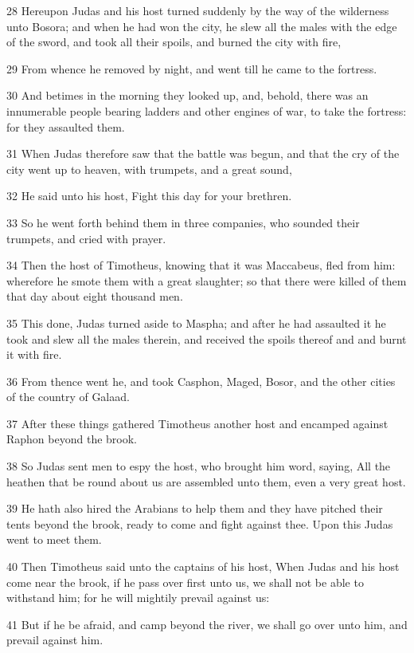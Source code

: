 \par 28 Hereupon Judas and his host turned suddenly by the way of the wilderness unto Bosora; and when he had won the city, he slew all the males with the edge of the sword, and took all their spoils, and burned the city with fire,
\par 29 From whence he removed by night, and went till he came to the fortress.
\par 30 And betimes in the morning they looked up, and, behold, there was an innumerable people bearing ladders and other engines of war, to take the fortress: for they assaulted them.
\par 31 When Judas therefore saw that the battle was begun, and that the cry of the city went up to heaven, with trumpets, and a great sound,
\par 32 He said unto his host, Fight this day for your brethren.
\par 33 So he went forth behind them in three companies, who sounded their trumpets, and cried with prayer.
\par 34 Then the host of Timotheus, knowing that it was Maccabeus, fled from him: wherefore he smote them with a great slaughter; so that there were killed of them that day about eight thousand men.
\par 35 This done, Judas turned aside to Maspha; and after he had assaulted it he took and slew all the males therein, and received the spoils thereof and and burnt it with fire.
\par 36 From thence went he, and took Casphon, Maged, Bosor, and the other cities of the country of Galaad.
\par 37 After these things gathered Timotheus another host and encamped against Raphon beyond the brook.
\par 38 So Judas sent men to espy the host, who brought him word, saying, All the heathen that be round about us are assembled unto them, even a very great host.
\par 39 He hath also hired the Arabians to help them and they have pitched their tents beyond the brook, ready to come and fight against thee. Upon this Judas went to meet them.
\par 40 Then Timotheus said unto the captains of his host, When Judas and his host come near the brook, if he pass over first unto us, we shall not be able to withstand him; for he will mightily prevail against us:
\par 41 But if he be afraid, and camp beyond the river, we shall go over unto him, and prevail against him.
